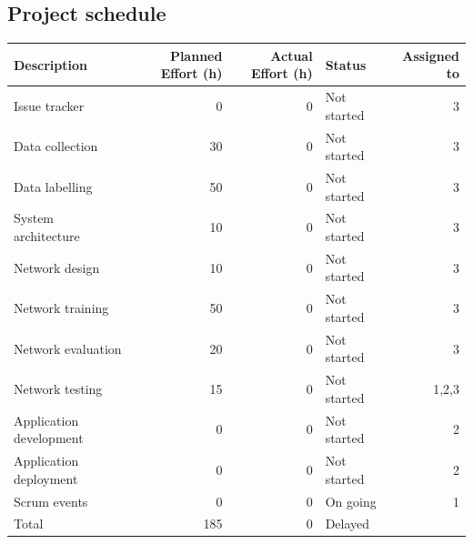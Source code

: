 \documentclass{article}
\begin{document}
\subsection{Project schedule}
\label{sec:orgb126deb}

\begin{center}
\begin{tabular}{lrrlr}
Description & Planned Effort (h) & Actual Effort (h) & Status & Assigned to\\
\hline
Issue tracker & 0 & 0 & Not started & 3\\
Data collection & 30 & 0 & Not started & 3\\
Data labelling & 50 & 0 & Not started & 3\\
System architecture & 10 & 0 & Not started & 3\\
Network design & 10 & 0 & Not started & 3\\
Network training & 50 & 0 & Not started & 3\\
Network evaluation & 20 & 0 & Not started & 3\\
Network testing & 15 & 0 & Not started & 1,2,3\\
Application development & 0 & 0 & Not started & 2\\
Application deployment & 0 & 0 & Not started & 2\\
Scrum events & 0 & 0 & On going & 1\\
\hline
Total & 185 & 0 & Delayed & \\
\end{tabular}
\end{center}
\end{document}
